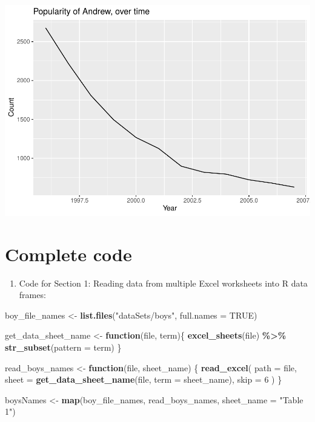 \documentclass[
]{book}
\newenvironment{Shaded}{\begin{snugshade}}{\end{snugshade}}
\newcommand{\ControlFlowTok}[1]{\textcolor[rgb]{0.13,0.29,0.53}{\textbf{#1}}}
\newcommand{\DataTypeTok}[1]{\textcolor[rgb]{0.13,0.29,0.53}{#1}}
\newcommand{\DecValTok}[1]{\textcolor[rgb]{0.00,0.00,0.81}{#1}}
\newcommand{\KeywordTok}[1]{\textcolor[rgb]{0.13,0.29,0.53}{\textbf{#1}}}
\newcommand{\NormalTok}[1]{#1}
\newcommand{\OperatorTok}[1]{\textcolor[rgb]{0.81,0.36,0.00}{\textbf{#1}}}
\newcommand{\OtherTok}[1]{\textcolor[rgb]{0.56,0.35,0.01}{#1}}
\newcommand{\StringTok}[1]{\textcolor[rgb]{0.31,0.60,0.02}{#1}}
\providecommand{\tightlist}{%
  \setlength{\itemsep}{0pt}\setlength{\parskip}{0pt}}
\begin{document}
\begin{alert}
\includegraphics{R/RDataWrangling/figures/unnamed-chunk-261-1.pdf}

\end{alert}

\hypertarget{complete-code}{%
\section{Complete code}\label{complete-code}}

\begin{enumerate}
\def\labelenumi{\arabic{enumi}.}
\tightlist
\item
  Code for Section 1: Reading data from multiple Excel worksheets into R data frames:
\end{enumerate}

\begin{Shaded}
\begin{Highlighting}[]
\NormalTok{boy\_file\_names \textless{}{-}}\StringTok{ }\KeywordTok{list.files}\NormalTok{(}\StringTok{"dataSets/boys"}\NormalTok{, }\DataTypeTok{full.names =} \OtherTok{TRUE}\NormalTok{)}

\NormalTok{get\_data\_sheet\_name \textless{}{-}}\StringTok{ }\ControlFlowTok{function}\NormalTok{(file, term)\{}
  \KeywordTok{excel\_sheets}\NormalTok{(file) }\OperatorTok{\%\textgreater{}\%}\StringTok{ }\KeywordTok{str\_subset}\NormalTok{(}\DataTypeTok{pattern =}\NormalTok{ term)}
\NormalTok{\}}

\NormalTok{read\_boys\_names \textless{}{-}}\StringTok{ }\ControlFlowTok{function}\NormalTok{(file, sheet\_name) \{}
  \KeywordTok{read\_excel}\NormalTok{(}
    \DataTypeTok{path =}\NormalTok{ file,}
    \DataTypeTok{sheet =} \KeywordTok{get\_data\_sheet\_name}\NormalTok{(file, }\DataTypeTok{term =}\NormalTok{ sheet\_name),}
    \DataTypeTok{skip =} \DecValTok{6}
\NormalTok{  )}
\NormalTok{\}}

\NormalTok{boysNames \textless{}{-}}\StringTok{ }\KeywordTok{map}\NormalTok{(boy\_file\_names, read\_boys\_names, }\DataTypeTok{sheet\_name =} \StringTok{"Table 1"}\NormalTok{)}
\end{Highlighting}
\end{Shaded}
\end{document}

